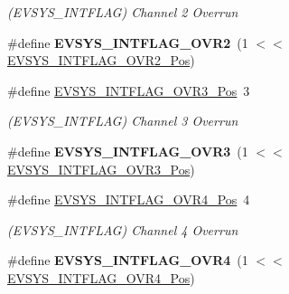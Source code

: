 \begin{DoxyCompactItemize}
\begin{DoxyCompactList}\small\item\em (E\+V\+S\+Y\+S\+\_\+\+I\+N\+T\+F\+L\+A\+G) Channel 2 Overrun \end{DoxyCompactList}\item 
\hypertarget{group___s_a_m_l21___e_v_s_y_s_gaa366c617f3bba83319dcda712edcca2f}{}\#define {\bfseries E\+V\+S\+Y\+S\+\_\+\+I\+N\+T\+F\+L\+A\+G\+\_\+\+O\+V\+R2}~(1 $<$$<$ \hyperlink{group___s_a_m_l21___e_v_s_y_s_ga2f068982e90e4b6e331591b488da07a0}{E\+V\+S\+Y\+S\+\_\+\+I\+N\+T\+F\+L\+A\+G\+\_\+\+O\+V\+R2\+\_\+\+Pos})\label{group___s_a_m_l21___e_v_s_y_s_gaa366c617f3bba83319dcda712edcca2f}

\item 
\hypertarget{group___s_a_m_l21___e_v_s_y_s_gaed357abedf732af9a5a4d1085f061f68}{}\#define \hyperlink{group___s_a_m_l21___e_v_s_y_s_gaed357abedf732af9a5a4d1085f061f68}{E\+V\+S\+Y\+S\+\_\+\+I\+N\+T\+F\+L\+A\+G\+\_\+\+O\+V\+R3\+\_\+\+Pos}~3\label{group___s_a_m_l21___e_v_s_y_s_gaed357abedf732af9a5a4d1085f061f68}

\begin{DoxyCompactList}\small\item\em (E\+V\+S\+Y\+S\+\_\+\+I\+N\+T\+F\+L\+A\+G) Channel 3 Overrun \end{DoxyCompactList}\item 
\hypertarget{group___s_a_m_l21___e_v_s_y_s_gaeb1dd5f9f37881ebbd1232ed722d35e1}{}\#define {\bfseries E\+V\+S\+Y\+S\+\_\+\+I\+N\+T\+F\+L\+A\+G\+\_\+\+O\+V\+R3}~(1 $<$$<$ \hyperlink{group___s_a_m_l21___e_v_s_y_s_gaed357abedf732af9a5a4d1085f061f68}{E\+V\+S\+Y\+S\+\_\+\+I\+N\+T\+F\+L\+A\+G\+\_\+\+O\+V\+R3\+\_\+\+Pos})\label{group___s_a_m_l21___e_v_s_y_s_gaeb1dd5f9f37881ebbd1232ed722d35e1}

\item 
\hypertarget{group___s_a_m_l21___e_v_s_y_s_ga2162e5fe2433855fd02adf4ba780b521}{}\#define \hyperlink{group___s_a_m_l21___e_v_s_y_s_ga2162e5fe2433855fd02adf4ba780b521}{E\+V\+S\+Y\+S\+\_\+\+I\+N\+T\+F\+L\+A\+G\+\_\+\+O\+V\+R4\+\_\+\+Pos}~4\label{group___s_a_m_l21___e_v_s_y_s_ga2162e5fe2433855fd02adf4ba780b521}

\begin{DoxyCompactList}\small\item\em (E\+V\+S\+Y\+S\+\_\+\+I\+N\+T\+F\+L\+A\+G) Channel 4 Overrun \end{DoxyCompactList}\item 
\hypertarget{group___s_a_m_l21___e_v_s_y_s_ga2b520837a0247599997bef38dfc1b2aa}{}\#define {\bfseries E\+V\+S\+Y\+S\+\_\+\+I\+N\+T\+F\+L\+A\+G\+\_\+\+O\+V\+R4}~(1 $<$$<$ \hyperlink{group___s_a_m_l21___e_v_s_y_s_ga2162e5fe2433855fd02adf4ba780b521}{E\+V\+S\+Y\+S\+\_\+\+I\+N\+T\+F\+L\+A\+G\+\_\+\+O\+V\+R4\+\_\+\+Pos})\label{group___s_a_m_l21___e_v_s_y_s_ga2b520837a0247599997bef38dfc1b2aa}


\end{DoxyCompactItemize}
